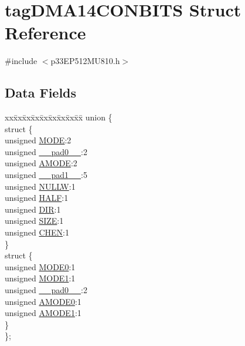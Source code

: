 \hypertarget{structtag_d_m_a14_c_o_n_b_i_t_s}{}\section{tag\+D\+M\+A14\+C\+O\+N\+B\+I\+TS Struct Reference}
\label{structtag_d_m_a14_c_o_n_b_i_t_s}


{\ttfamily \#include $<$p33\+E\+P512\+M\+U810.\+h$>$}

\subsection*{Data Fields}
\begin{DoxyCompactItemize}
\item 
\begin{tabbing}
xx\=xx\=xx\=xx\=xx\=xx\=xx\=xx\=xx\=\kill
union \{\\
\>struct \{\\
\>\>unsigned \hyperlink{structtag_d_m_a14_c_o_n_b_i_t_s_adc56ba18ff3f1599c85d222bee624424}{MODE}:2\\
\>\>unsigned \hyperlink{structtag_d_m_a14_c_o_n_b_i_t_s_adf71f3d8410c1f1dbbc96680a92c49af}{\_\_pad0\_\_}:2\\
\>\>unsigned \hyperlink{structtag_d_m_a14_c_o_n_b_i_t_s_ab3ff4e1f1b9a1037418ca7b6cb2e8f77}{AMODE}:2\\
\>\>unsigned \hyperlink{structtag_d_m_a14_c_o_n_b_i_t_s_acaf2d0924a107ec6e8d2e31febaf66f9}{\_\_pad1\_\_}:5\\
\>\>unsigned \hyperlink{structtag_d_m_a14_c_o_n_b_i_t_s_a1d3f7d04416314131889d1671a9287ad}{NULLW}:1\\
\>\>unsigned \hyperlink{structtag_d_m_a14_c_o_n_b_i_t_s_a1a715a64b2576f59401ac93d6f9a086a}{HALF}:1\\
\>\>unsigned \hyperlink{structtag_d_m_a14_c_o_n_b_i_t_s_ad6868749602045a76f36ffdf964dfd39}{DIR}:1\\
\>\>unsigned \hyperlink{structtag_d_m_a14_c_o_n_b_i_t_s_a5863cac6dc2cb330bdd0b1c66da70ffe}{SIZE}:1\\
\>\>unsigned \hyperlink{structtag_d_m_a14_c_o_n_b_i_t_s_a092934036fdfb8df5259db288fe438ca}{CHEN}:1\\
\>\} \\
\>struct \{\\
\>\>unsigned \hyperlink{structtag_d_m_a14_c_o_n_b_i_t_s_abc938903e74bff48935569d0c5b19035}{MODE0}:1\\
\>\>unsigned \hyperlink{structtag_d_m_a14_c_o_n_b_i_t_s_a7a9f7514566d0626724ce6c4b81b5ea2}{MODE1}:1\\
\>\>unsigned \hyperlink{structtag_d_m_a14_c_o_n_b_i_t_s_adf71f3d8410c1f1dbbc96680a92c49af}{\_\_pad0\_\_}:2\\
\>\>unsigned \hyperlink{structtag_d_m_a14_c_o_n_b_i_t_s_a0a1f894a2695c1388a5412244636805b}{AMODE0}:1\\
\>\>unsigned \hyperlink{structtag_d_m_a14_c_o_n_b_i_t_s_a3fde4abc0dc3db6fef6afc28c565ce3e}{AMODE1}:1\\
\>\} \\
\}; \\


\end{tabbing}
\end{DoxyCompactItemize}
